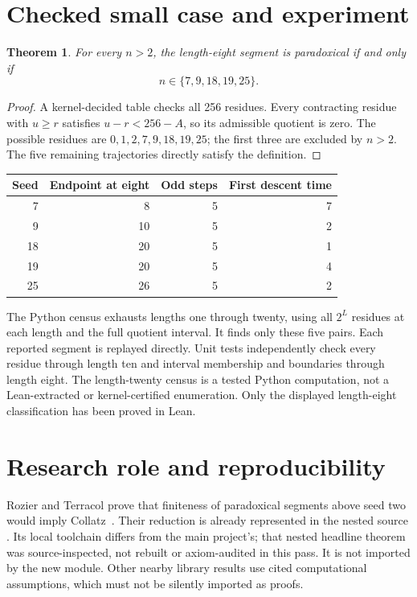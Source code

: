 \documentclass[11pt]{article}
\newtheorem{theorem}{Theorem}
\begin{document}
\section{Checked small case and experiment}
\begin{theorem}
For every $n>2$, the length-eight segment is paradoxical if and only if
\[
n\in\{7,9,18,19,25\}.
\]
\end{theorem}
\begin{proof}
A kernel-decided table checks all 256 residues. Every contracting residue with $u\ge r$ satisfies $u-r<256-A$, so its admissible quotient is zero. The possible residues are $0,1,2,7,9,18,19,25$; the first three are excluded by $n>2$. The five remaining trajectories directly satisfy the definition.
\end{proof}
\begin{center}
\begin{tabular}{rrrr}
\toprule
Seed&Endpoint at eight&Odd steps&First descent time\\
\midrule
7&8&5&7\\9&10&5&2\\18&20&5&1\\19&20&5&4\\25&26&5&2\\
\bottomrule
\end{tabular}
\end{center}
The Python census exhausts lengths one through twenty, using all $2^L$ residues at each length and the full quotient interval. It finds only these five pairs. Each reported segment is replayed directly. Unit tests independently check every residue through length ten and interval membership and boundaries through length eight. The length-twenty census is a tested Python computation, not a Lean-extracted or kernel-certified enumeration. Only the displayed length-eight classification has been proved in Lean.

\section{Research role and reproducibility}
Rozier and Terracol prove that finiteness of paradoxical segments above seed two would imply Collatz~\cite{RT}. Their reduction is already represented in the nested source . Its local toolchain differs from the main project's; that nested headline theorem was source-inspected, not rebuilt or axiom-audited in this pass. It is not imported by the new module. Other nearby library results use cited computational assumptions, which must not be silently imported as proofs.
\end{document}
